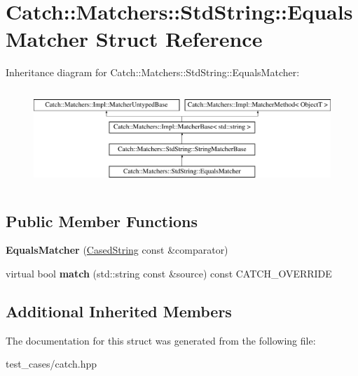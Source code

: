 \hypertarget{structCatch_1_1Matchers_1_1StdString_1_1EqualsMatcher}{}\section{Catch\+:\+:Matchers\+:\+:Std\+String\+:\+:Equals\+Matcher Struct Reference}
\label{structCatch_1_1Matchers_1_1StdString_1_1EqualsMatcher}
Inheritance diagram for Catch\+:\+:Matchers\+:\+:Std\+String\+:\+:Equals\+Matcher\+:\begin{figure}[H]
\begin{center}
\leavevmode
\includegraphics[height=3.696370cm]{structCatch_1_1Matchers_1_1StdString_1_1EqualsMatcher}
\end{center}
\end{figure}
\subsection*{Public Member Functions}
\begin{DoxyCompactItemize}
\item 
\mbox{\label{structCatch_1_1Matchers_1_1StdString_1_1EqualsMatcher_ab740f1fb2310e9fe3fed5134d4c7e4c8}} 
{\bfseries Equals\+Matcher} (\hyperlink{structCatch_1_1Matchers_1_1StdString_1_1CasedString}{Cased\+String} const \&comparator)
\item 
\mbox{\label{structCatch_1_1Matchers_1_1StdString_1_1EqualsMatcher_a2aeaac3c0efb8422643cd1b155256213}} 
virtual bool {\bfseries match} (std\+::string const \&source) const C\+A\+T\+C\+H\+\_\+\+O\+V\+E\+R\+R\+I\+DE
\end{DoxyCompactItemize}
\subsection*{Additional Inherited Members}


The documentation for this struct was generated from the following file\+:\begin{DoxyCompactItemize}
\item 
test\+\_\+cases/catch.\+hpp\end{DoxyCompactItemize}
